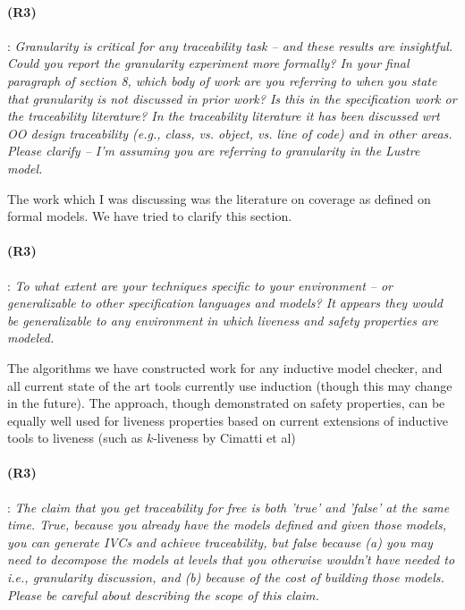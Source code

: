 \documentclass{article}
\begin{document}
\paragraph{(R3)}: \textit{Granularity is critical for any traceability task -- and these results are insightful. Could you report the granularity experiment more formally? In your final paragraph of section 8, which body of work are you referring to when you state that granularity is not discussed in prior work? Is this in the specification work or the traceability literature? In the traceability literature it has been discussed wrt OO design traceability (e.g., class, vs. object, vs. line of code) and in other areas. Please clarify -- I'm assuming you are referring to granularity in the Lustre model.}
\vspace{0.05in}

The work which I was discussing was the literature on coverage as defined on formal models.  We have tried to clarify this section. 

\paragraph{(R3)}: \textit{To what extent are your techniques specific to your environment -- or generalizable to other specification languages and models? It appears they would be generalizable to any environment in which liveness and safety properties are modeled.}
\vspace{0.05in}

The algorithms we have constructed work for any inductive model checker, and all current state of the art tools currently use induction (though this may change in the future).  The approach, though demonstrated on safety properties, can be equally well used for liveness properties based on current extensions of inductive tools to liveness (such as $k$-liveness by Cimatti et al)

\paragraph{(R3)}: \textit{The claim that you get traceability for free is both 'true' and 'false' at the same time. True, because you already have the models defined and given those models, you can generate IVCs and achieve traceability, but false because   (a) you may need to decompose the models at levels that you otherwise wouldn't have needed to i.e., granularity discussion, and  (b) because of the cost of building those models.   Please be careful about describing the scope of this claim.}
\vspace{0.05in}
\end{document}

